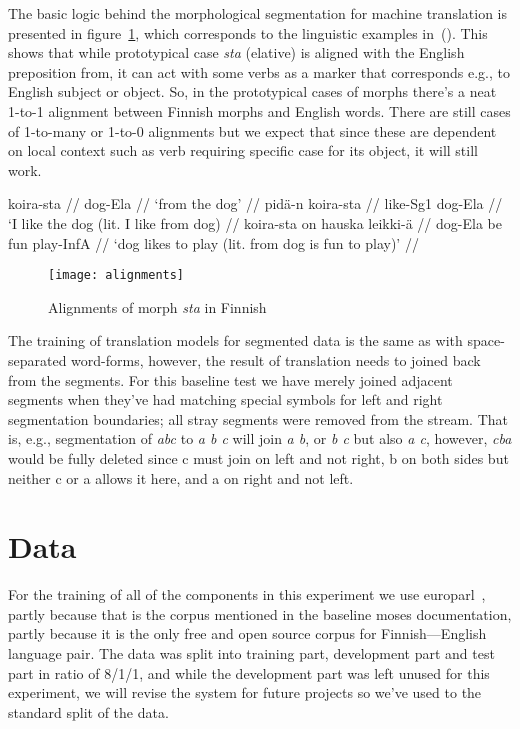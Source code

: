 \documentclass[color]{pbml}
\begin{document}
The basic logic behind the morphological segmentation for machine translation
is presented in figure~\ref{fig:alignments}, which corresponds to the
linguistic examples in~(\nextx). This shows that while prototypical case
\emph{sta} (elative) is aligned with the English preposition from, it can act
with some verbs as a marker that corresponds e.g., to English subject or
object. So, in the prototypical cases of morphs there's a neat 1-to-1 alignment
between Finnish morphs and English words. There are still cases of 1-to-many or
1-to-0 alignments but we expect that since these are dependent on local context
such as verb requiring specific case for its object, it will still work.

\pex
\a
    \begingl
    \gla koira-sta //
    \glb dog-{\sc Ela} //
    \glft `from the dog' //
    \endgl
\a
    \begingl
    \gla pidä-n koira-sta //
    \glb like-{\sc Sg1} dog-{\sc Ela} //
    \glft `I like the dog (lit. I like from dog) //
    \endgl
\a
    \begingl
    \gla koira-sta on hauska leikki-ä //
    \glb dog-{\sc Ela} be fun play-{\sc InfA} //
    \glft `dog likes to play (lit. from dog is fun to play)' //
    \endgl
\xe

\begin{figure}
    \begin{center}
        \texttt{[image: alignments]}
    \end{center}
    \caption{Alignments of morph \emph{sta} in Finnish
    \label{fig:alignments}}
\end{figure}

The training of translation models for segmented data is the same as with 
space-separated word-forms, however, the result of translation needs to joined
back from the segments. For this baseline test we have merely joined adjacent
segments when they've had matching special symbols for left and right
segmentation boundaries; all stray segments were removed from the stream. That
is, e.g., segmentation of \emph{abc} to \emph{a b c} will join \emph{a b}, or
\emph{b c} but also \emph{a c}, however, \emph{cba} would be fully deleted
since c must join on left and not right, b on both sides but neither c or a
allows it here, and a on right and not left.

\section{Data}
\label{sec:data}

For the training of all of the components in this experiment we use 
europarl~\citep{koehn2005europarl}, partly because that is the corpus mentioned
in the baseline moses documentation, partly because it is the only free and open
source corpus for Finnish---English language pair. The data was split into
training part, development part and test part in ratio of 8/1/1, and while the
development part was left unused for this experiment, we will revise the system
for future projects so we've used to the standard split of the data.
\end{document}
